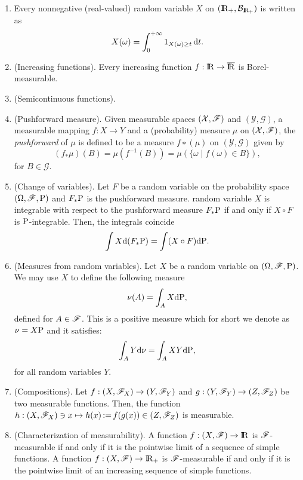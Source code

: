 \documentclass[a4paper,10pt]{article}
\begin{document}
\begin{enumerate}
 \item \label{rv221030}
      Every nonnegative (real-valued) random variable $X$ on $(\Re_+, \B_{{\Re}_+})$ 
      is written as 
      \[
        X(\omega) = \int_0^{+\infty} 1_{X(\omega)\geq t}\,\mathrm{d} t.
      \]

 \item (Increasing functions).  Every increasing function $f:\Re\to\barre$ is Borel-measurable.
 
 \item (Semicontinuous functions). 
 \item (Pushforward measure). Given measurable spaces $(\mathcal{X},\mathscr{F})$ and $(\mathcal{Y}, \mathcal{G})$, 
 a measurable mapping $f: X \to Y$ and a (probability) measure $\mu$ on $(\mathcal{X},\mathscr{F})$, the \textit{pushforward} of $\mu$
 is defined to be a measure $f∗(\mu)$ on $(\mathcal{Y}, \mathcal{G})$ given by
 \[
  (f_*\mu)(B) = \mu(f^{-1}(B)) = \mu(\{\omega\mid f(\omega)\in B\}),
 \]
 for $B\in\mathcal{G}$.
 \item (Change of variables). Let $F$ be a random variable on the probability space $(\Omega,\mathscr{F},\mathrm{P})$ and $F_*\mathrm{P}$ 
 is the pushforward measure. random variable $X$ is integrable with respect to the pushforward measure $F_*\mathrm{P}$
 if and only if $X\circ F$ is $\mathrm{P}$-integrable. Then, the integrals coincide
 \[
  \int X \mathrm{d}(F_*\mathrm{P}) = \int (X\circ F) \mathrm{d} \mathrm{P}.
 \]
 \item (Measures from random variables). Let $X$ be a random variable on $(\Omega,\mathscr{F},\mathrm{P})$. 
       We may use $X$ to define the following measure
       \[
        \nu(A) = \int_A X\mathrm{d} \mathrm{P},
       \]
       defined for $A\in\mathscr{F}$. This is a positive measure which for short we denote as $\nu=X\mathrm{P}$
       and it satisfies:
       \[
        \int_A Y\mathrm{d} \nu = \int_A XY\mathrm{d} \mathrm{P},
       \]
       for all random variables $Y$.
       
 \item (Compositions). Let $f:(X,\mathscr{F}_X)\to (Y, \mathscr{F}_Y)$ and $g:(Y,\mathscr{F}_Y)\to (Z,\mathscr{F}_Z)$ be two measurable functions. 
       Then, the function $h:(X,\mathscr{F}_X)\ni x\mapsto h(x) {}\mathop{\mathrel{:}=}{} f(g(x)) \in (Z,\mathscr{F}_Z)$ is measurable. 
       
 \item (Characterization of measurability). A function $f:(X,\F)\to\Re$ is $\mathscr{F}$-measurable if and only if 
       it is the pointwise limit of a sequence of simple functions. A function $f:(X,\F)\to\Re_+$ is 
       $\mathscr{F}$-measurable if and only if  it is the pointwise limit of an increasing sequence of simple functions. 
       

\end{enumerate}
\end{document}
